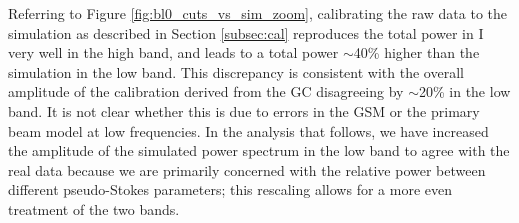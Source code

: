 \documentclass[twocolumn, trackchanges]{aastex61}
\begin{document}
Referring to Figure \ref{fig:bl0_cuts_vs_sim_zoom}, calibrating the raw data to
the simulation as described in Section \ref{subsec:cal} reproduces the total
power in I very well in the high band, and leads to a total power $\sim$40\%
higher than the simulation in the low band. This discrepancy is consistent with
the overall amplitude of the calibration derived from the GC disagreeing by
$\sim$20\% in the low band. It is not clear whether this is due to errors in the
GSM or the primary beam model at low frequencies.  In the analysis that follows,
we have increased the amplitude of the simulated power spectrum in the low band
to agree with the real data because we are primarily concerned with the relative
power between different pseudo-Stokes parameters; this rescaling allows for a
more even treatment of the two bands.



\end{document}
